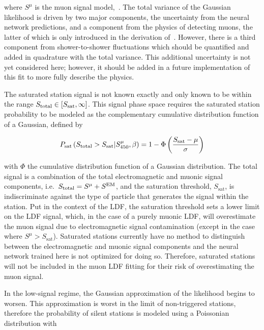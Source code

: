 \noindent
where $S^{\mu}$ is the muon signal model,~.
The total variance of the Gaussian likelihood is driven by two major components, the uncertainty from the neural network predictions, and a component from the physics of detecting muons, the latter of which is only introduced in the derivation of~.
However, there is a third component from shower-to-shower fluctuations which should be quantified and added in quadrature with the total variance. 
This additional uncertainty is not yet considered here; however, it should be added in a future implementation of this fit to more fully describe the physics.

The saturated station signal is not known exactly and only known to be within the range $S_{\rm total}\in\left[S_{\rm sat}, \infty\right]$.
This signal phase space requires the saturated station probability to be modeled as the complementary cumulative distribution function of a Gaussian, defined by

\begin{equation}
  P_{\rm sat}\left(S_{\text{total}} > S_{\rm sat} | S^{\mu}_{450}, \beta\right) = 1 - \Phi\left(\frac{S_{\rm sat} - \mu}{\sigma}\right) \label{eg:saturated}
\end{equation}

\noindent
with $\Phi$ the cumulative distribution function of a Gaussian distribution.
The total signal is a combination of the total electromagnetic and muonic signal components, i.e.~$S_{\rm total} = S^{\mu} + S^{\text{EM}}$, and the saturation threshold, $S_{\text{sat}}$, is indiscriminate against the type of particle that generates the signal within the station.
Put in the context of the LDF, the saturation threshold sets a lower limit on the LDF signal, which, in the case of a purely muonic LDF, will overestimate the muon signal due to electromagnetic signal contamination (except in the case where $S^{\mu}>S_{\text{sat}}$).
Saturated stations currently have no method to distinguish between the electromagnetic and muonic signal components and the neural network trained here is not optimized for doing so.
Therefore, saturated stations will not be included in the muon LDF fitting for their risk of overestimating the muon signal.

In the low-signal regime, the Gaussian approximation of the likelihood begins to worsen.
This approximation is worst in the limit of non-triggered stations, therefore the probability of silent stations is modeled using a Poissonian distribution with

